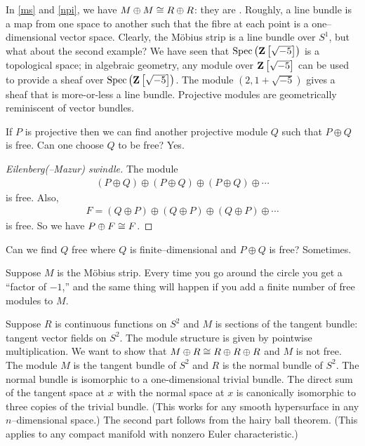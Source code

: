 \documentclass[11pt, oneside,margin=1in]{article}
\begin{document}
In \cref{ms} and \cref{npi}, we have $M\oplus M\cong R\oplus R$: they are . Roughly, a line bundle is a map from one space to another such that the fibre at each point is a one--dimensional vector space. Clearly, the M\"obius strip is a line bundle over $S^1$, but what about the second example? We have seen that $\operatorname{Spec}\left(\mathbf Z\left[ \sqrt{-5}  \right]\right )$ is a topological space; in algebraic geometry, any module over $\mathbf Z\left[ \sqrt{-5}  \right] $ can be used to provide a sheaf over $\operatorname{Spec}\left(\mathbf Z\left[ \sqrt{-5}  \right]\right )$. The module $(2, 1+\sqrt{-5} )$ gives a sheaf that is more-or-less a line bundle. Projective modules are geometrically reminiscent of vector bundles.

If $P$ is projective then we can find another projective module $Q$ such that $P\oplus Q$ is free. Can one choose $Q$ to be free? Yes. 
\begin{proof}[Eilenberg(--Mazur) swindle]
The module \begin{align*}
	(P \oplus Q) \oplus( P \oplus Q) \oplus( P \oplus Q) \oplus \cdots
\end{align*}
is free. Also, \begin{align*}
	F = (Q\oplus P) \oplus (Q\oplus P)\oplus  (Q\oplus P)\oplus\cdots
\end{align*}
is free. So we have $P\oplus F \cong F$. 
\end{proof}

Can we find $Q$ free where $Q$ is finite--dimensional and $P\oplus Q$ is free? Sometimes.

Suppose $M$ is the M\"obius strip. Every time you go around the circle you get a ``factor of $-1$,'' and the same thing will happen if you add a finite number of free modules to $M$.

Suppose $R$ is continuous functions on $S^2$ and $M$ is sections of the tangent bundle: tangent vector fields on $S^2$. The module structure is given by pointwise multiplication. We want to show that $M\oplus R \cong R\oplus R\oplus R$ and $M$ is not free. The module $M$ is the tangent bundle of $S^2$ and $R$ is the normal bundle of $S^2$. The normal bundle is isomorphic to a one-dimensional trivial bundle. The direct sum of the tangent space at $x$ with the normal space at $x$ is canonically isomorphic to three copies of the trivial bundle. (This works for any smooth hypersurface in any $n$--dimensional space.) The second part follows from the hairy ball theorem. (This applies to any compact manifold with nonzero Euler characteristic.) 
\end{document}
